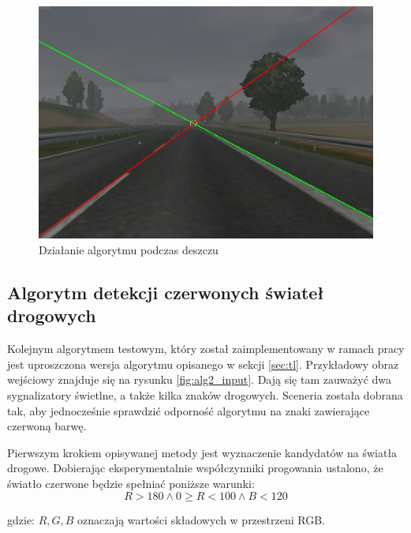 \begin{figure}
  \centering
  \includegraphics[width=13cm]{img/alg1_rain.jpg}
  \caption{Działanie algorytmu podczas deszczu}
  \label{fig:alg1_rain}
\end{figure}


\subsection{Algorytm detekcji czerwonych świateł drogowych} %

Kolejnym algorytmem testowym, który został zaimplementowany w ramach pracy jest uproszczona wersja algorytmu opisanego w sekcji \ref{sec:tl}. %
Przykładowy obraz wejściowy znajduje się na rysunku \ref{fig:alg2_input}. 
Dają się tam zauważyć dwa sygnalizatory świetlne, a także kilka znaków drogowych. 
Sceneria została dobrana tak, aby jednocześnie sprawdzić odporność algorytmu na znaki zawierające czerwoną barwę.

Pierwszym krokiem opisywanej metody jest wyznaczenie kandydatów na światła drogowe. 
Dobierając eksperymentalnie współczynniki progowania ustalono, że światło czerwone będzie spełniać poniższe warunki:
\begin{equation}
\label{eq:tl}
R>180 \wedge 0 \geq R<100 \wedge B < 120
\end{equation}

gdzie: $R, G, B$ oznaczają wartości składowych w przestrzeni RGB.

